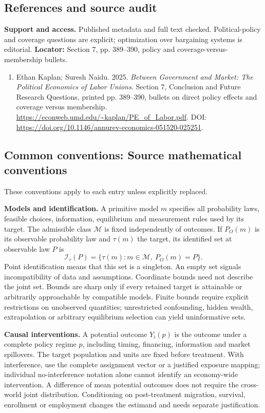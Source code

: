 \documentclass[11pt,a4paper]{article}
\begin{document}
\subsection*{References and source audit}
\textbf{Support and access.} Published metadata and full text checked. Political-policy and coverage questions are explicit; optimization over bargaining systems is editorial. \textbf{Locator:} Section 7, pp. 389--390, policy and coverage-versus-membership bullets.
\begin{enumerate}\raggedright
\item\hypertarget{definitions:source:30007636:1}{} Ethan Kaplan; Suresh Naidu. 2025. \emph{Between Government and Market: The Political Economics of Labor Unions}. Section 7, Conclusion and Future Research Questions, printed pp. 389–390, bullets on direct policy effects and coverage versus membership.
\url{https://econweb.umd.edu/~kaplan/PE_of_Labor.pdf}.
DOI: \url{https://doi.org/10.1146/annurev-economics-051520-025251}.
\end{enumerate}

\subsection*{Common conventions: Source mathematical conventions}

These conventions apply to each entry unless explicitly replaced.

\textbf{Models and identification.} A primitive model \(m\) specifies all probability laws, feasible choices, information, equilibrium and measurement rules used by its target. The admissible class \(\mathcal M\) is fixed independently of outcomes. If \(P_O(m)\) is its observable probability law and \(\tau(m)\) the target, its identified set at observable law \(P\) is
\[
 \mathcal I_\tau(P)=\{\tau(m):m\in\mathcal M,\ P_O(m)=P\}.
\]
Point identification means that this set is a singleton. An empty set signals incompatibility of data and assumptions. Coordinate bounds need not describe the joint set. Bounds are sharp only if every retained target is attainable or arbitrarily approachable by compatible models. Finite bounds require explicit restrictions on unobserved quantities; unrestricted confounding, hidden wealth, extrapolation or arbitrary equilibrium selection can yield uninformative sets.

\textbf{Causal interventions.} A potential outcome \(Y_i(p)\) is the outcome under a complete policy regime \(p\), including timing, financing, information and market spillovers. The target population and units are fixed before treatment. With interference, use the complete assignment vector or a justified exposure mapping; individual no-interference notation alone cannot identify an economy-wide intervention. A difference of mean potential outcomes does not require the cross-world joint distribution. Conditioning on post-treatment migration, survival, enrollment or employment changes the estimand and needs separate justification.
\end{document}
